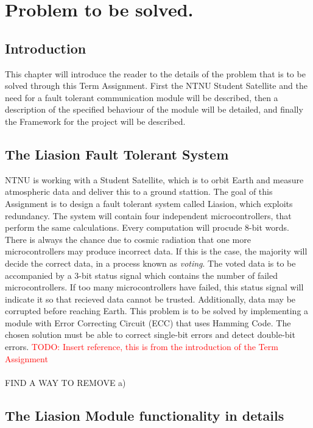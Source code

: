 \documentclass[a4paper]{IEEEtran}
\newcommand\TODO[1]{\textcolor{red}{TODO:#1}}
\newcommand\todo[1]{\TODO{#1}}
\begin{document}
\section{Problem to be solved.}
\subsection{Introduction}
This chapter will introduce the reader to the details of the problem that is to be solved through this Term Assignment.
First the NTNU Student Satellite and the need for a fault tolerant communication module will be described, then a description of the specified behaviour of the module will be detailed, and finally the Framework for the project will be described.

\subsection{The Liasion Fault Tolerant System}
NTNU is working with a Student Satellite, which is to orbit Earth and measure atmospheric data and deliver this to a ground stattion.
The goal of this Assignment is to design a fault tolerant system called Liasion, which exploits redundancy.
The system will contain four independent microcontrollers, that perform the same calculations.
Every computation will procude 8-bit words.
There is always the chance due to cosmic radiation that one more microcontrollers may produce incorrect data.
If this is the case, the majority will decide the correct data, in a process known as \textit{voting}.
The voted data is to be accompanied by a 3-bit status signal which contains the number of failed microcontrollers.
If too many microcontrollers have failed, this status signal will indicate it so that recieved data cannot be trusted.
Additionally, data may be corrupted before reaching Earth.
This problem is to be solved by implementing a module with Error Correcting Circuit (ECC) that uses Hamming Code.
The chosen solution must be able to correct single-bit errors and detect double-bit errors.
\break 
\todo{ Insert reference, this is from the introduction of the Term Assignment}
\paragraph{}
FIND A WAY TO REMOVE a)


\subsection{The Liasion Module functionality in details}
\end{document}

